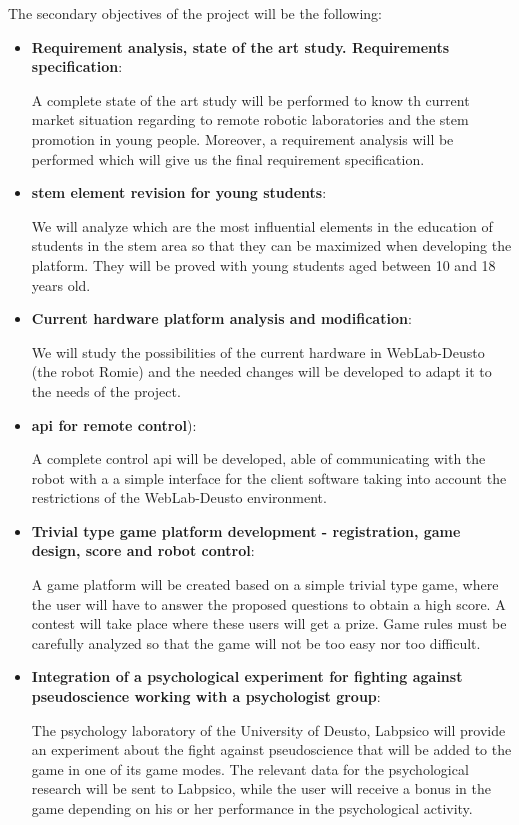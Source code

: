 The secondary objectives of the project will be the following:
\begin{itemize}
\item \textbf{Requirement analysis, state of the art study. Requirements specification}:

A complete state of the art study will be performed to know th current market situation regarding to
remote robotic laboratories and the \acrshort{stem} promotion in young people. Moreover, a
requirement analysis will be performed which will give us the final requirement specification.

\item \textbf{\acrshort{stem} element revision for young students}:

We will analyze which are the most influential elements in the education of students in the
\acrshort{stem} area so that they can be maximized when developing the platform. They will be proved
with young students aged between 10 and 18 years old.

\item \textbf{Current hardware platform analysis and modification}:

We will study the possibilities of the current hardware in WebLab-Deusto (the robot Romie) and the
needed changes will be developed to adapt it to the needs of the project.

\item \textbf{\acrshort{api} for remote control}):

A complete control \acrshort{api} will be developed, able of communicating with the robot with a
a simple interface for the client software taking into account the restrictions of the WebLab-Deusto
environment.

\item \textbf{Trivial type game platform development - registration, game design, score and robot
control}:

A game platform will be created based on a simple trivial type game, where the user will have to
answer the proposed questions to obtain a high score. A contest will take place where these users
will get a prize. Game rules must be carefully analyzed so that the game will not be too easy nor
too difficult.

\item \textbf{Integration of a psychological experiment for fighting against pseudoscience working
with a psychologist group}:

The psychology laboratory of the University of Deusto, Labpsico will provide an experiment about the
fight against pseudoscience that will be added to the game in one of its game modes. The relevant
data for the psychological research will be sent to Labpsico, while the user will receive a bonus in
the game depending on his or her performance in the psychological activity.


\end{itemize}
